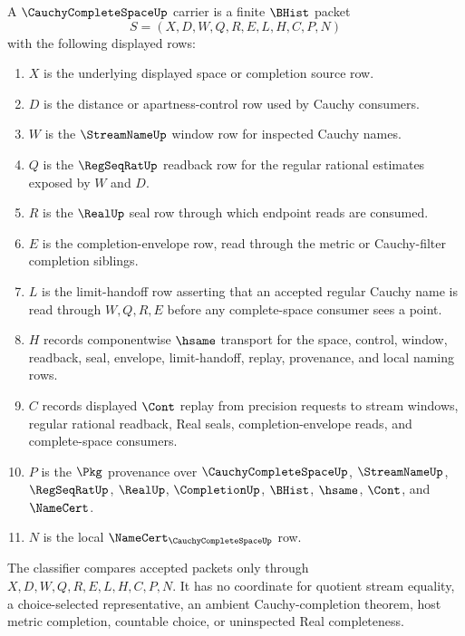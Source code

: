\begin{definition}
\label{def:cauchy-complete-space-carrier}
A $\CauchyCompleteSpaceUp$ carrier is a finite $\BHist$ packet
$$
S=(X,D,W,Q,R,E,L,H,C,P,N)
$$
with the following displayed rows:
\begin{enumerate}
\item $X$ is the underlying displayed space or completion source row.
\item $D$ is the distance or apartness-control row used by Cauchy consumers.
\item $W$ is the $\StreamNameUp$ window row for inspected Cauchy names.
\item $Q$ is the $\RegSeqRatUp$ readback row for the regular rational estimates exposed by $W$ and $D$.
\item $R$ is the $\RealUp$ seal row through which endpoint reads are consumed.
\item $E$ is the completion-envelope row, read through the metric or Cauchy-filter completion siblings.
\item $L$ is the limit-handoff row asserting that an accepted regular Cauchy name is read through $W,Q,R,E$ before any complete-space consumer sees a point.
\item $H$ records componentwise $\hsame$ transport for the space, control, window, readback, seal, envelope, limit-handoff, replay, provenance, and local naming rows.
\item $C$ records displayed $\Cont$ replay from precision requests to stream windows, regular rational readback, Real seals, completion-envelope reads, and complete-space consumers.
\item $P$ is the $\Pkg$ provenance over $\CauchyCompleteSpaceUp$, $\StreamNameUp$, $\RegSeqRatUp$, $\RealUp$, $\CompletionUp$, $\BHist$, $\hsame$, $\Cont$, and $\NameCert$.
\item $N$ is the local $\NameCert_{\CauchyCompleteSpaceUp}$ row.
\end{enumerate}
The classifier compares accepted packets only through $X,D,W,Q,R,E,L,H,C,P,N$. It has no coordinate for quotient stream equality, a choice-selected representative, an ambient Cauchy-completion theorem, host metric completion, countable choice, or uninspected Real completeness.
\end{definition}


